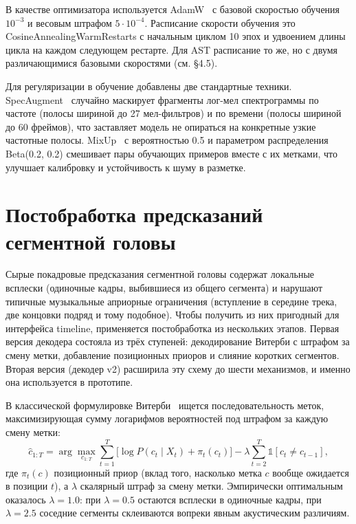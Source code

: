 В качестве оптимизатора используется AdamW~\cite{loshchilov2019adamw} с базовой скоростью обучения $10^{-3}$ и весовым штрафом $5 \cdot 10^{-4}$. Расписание скорости обучения это CosineAnnealingWarmRestarts с начальным циклом 10 эпох и удвоением длины цикла на каждом следующем рестарте. Для AST расписание то же, но с двумя различающимися базовыми скоростями (см. §4.5).

Для регуляризации в обучение добавлены две стандартные техники. SpecAugment~\cite{park2019specaugment} случайно маскирует фрагменты лог-мел спектрограммы по частоте (полосы шириной до 27 мел-фильтров) и по времени (полосы шириной до 60 фреймов), что заставляет модель не опираться на конкретные узкие частотные полосы. MixUp~\cite{zhang2018mixup} с вероятностью 0.5 и параметром распределения Beta(0.2, 0.2) смешивает пары обучающих примеров вместе с их метками, что улучшает калибровку и устойчивость к шуму в разметке.

\section{Постобработка предсказаний сегментной головы}\label{sec:4-7}

Сырые покадровые предсказания сегментной головы содержат локальные всплески (одиночные кадры, выбившиеся из общего сегмента) и нарушают типичные музыкальные априорные ограничения (вступление в середине трека, две концовки подряд и тому подобное). Чтобы получить из них пригодный для интерфейса timeline, применяется постобработка из нескольких этапов. Первая версия декодера состояла из трёх ступеней: декодирование Витерби с штрафом за смену метки, добавление позиционных приоров и слияние коротких сегментов. Вторая версия (декодер v2) расширила эту схему до шести механизмов, и именно она используется в прототипе.

В классической формулировке Витерби~\cite{forney1973viterbi} ищется последовательность меток, максимизирующая сумму логарифмов вероятностей под штрафом за каждую смену метки:
\[
\hat{c}_{1:T} = \arg\max_{c_{1:T}} \sum_{t=1}^{T} \big[ \log P(c_t \mid X_t) + \pi_t(c_t) \big] - \lambda \sum_{t=2}^{T} \mathbb{1}[c_t \neq c_{t-1}],
\]
где $\pi_t(c)$ позиционный приор (вклад того, насколько метка $c$ вообще ожидается в позиции $t$), а $\lambda$ скалярный штраф за смену метки. Эмпирически оптимальным оказалось $\lambda = 1.0$: при $\lambda = 0.5$ остаются всплески в одиночные кадры, при $\lambda = 2.5$ соседние сегменты склеиваются вопреки явным акустическим различиям.

